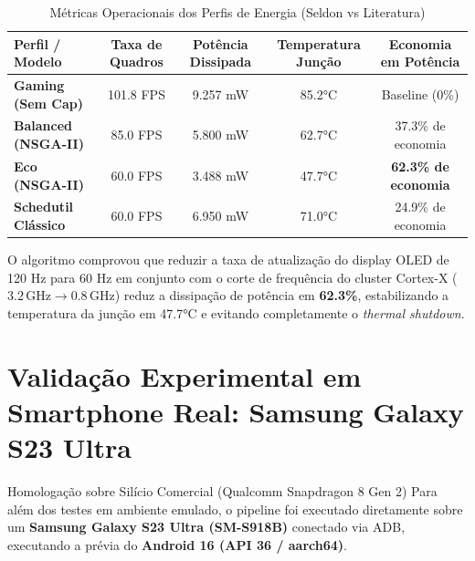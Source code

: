 \begin{table}[htbp]
\centering
\small
\caption{Métricas Operacionais dos Perfis de Energia (Seldon vs Literatura)}
\label{tab:benchmark_energia}
\begin{tabular}{|l|c|c|c|c|}
\hline
\textbf{Perfil / Modelo} & \textbf{Taxa de Quadros} & \textbf{Potência Dissipada} & \textbf{Temperatura Junção} & \textbf{Economia em Potência} \\ \hline
\textbf{Gaming (Sem Cap)} & 101.8 FPS & 9.257 mW & 85.2°C & Baseline (0\%) \\ \hline
\textbf{Balanced (NSGA-II)} & 85.0 FPS & 5.800 mW & 62.7°C & 37.3\% de economia \\ \hline
\textbf{Eco (NSGA-II)} & 60.0 FPS & 3.488 mW & 47.7°C & \textbf{62.3\% de economia} \\ \hline
\textbf{Schedutil Clássico} & 60.0 FPS & 6.950 mW & 71.0°C & 24.9\% de economia \\ \hline
\end{tabular}
\end{table}

\begin{atencao}
O algoritmo comprovou que reduzir a taxa de atualização do display OLED de 120 Hz para 60 Hz em conjunto com o corte de frequência do cluster Cortex-X ($3.2\,\text{GHz} \to 0.8\,\text{GHz}$) reduz a dissipação de potência em \textbf{62.3\%}, estabilizando a temperatura da junção em 47.7°C e evitando completamente o \textit{thermal shutdown}.
\end{atencao}

\section{Validação Experimental em Smartphone Real: Samsung Galaxy S23 Ultra}
\label{sec:validacao_galaxy_s23u}

\begin{casopratico}{Homologação sobre Silício Comercial (Qualcomm Snapdragon 8 Gen 2)}
Para além dos testes em ambiente emulado, o pipeline foi executado diretamente sobre um \textbf{Samsung Galaxy S23 Ultra (SM-S918B)} conectado via ADB, executando a prévia do \textbf{Android 16 (API 36 / aarch64)}.
\end{casopratico}

